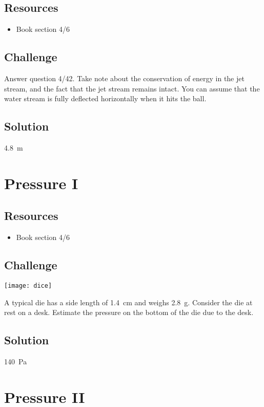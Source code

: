 \subsection*{Resources}
\begin{itemize}
    \item Book section 4/6
\end{itemize}

\subsection*{Challenge}
Answer question 4/42. Take note about the conservation of energy in the jet stream, and the fact that the jet stream remains intact. You can assume that the water stream is fully deflected horizontally when it hits the ball.

\subsection*{Solution}
\SI{4.8}{\meter}




\newpage
\section{Pressure I}

\subsection*{Resources}
\begin{itemize}
    \item Book section 4/6
\end{itemize}

\subsection*{Challenge}
\texttt{[image: dice]}

A typical die has a side length of \SI{1.4}{\cm} and weighs \SI{2.8}{\gram}. Consider the die at rest on a desk. Estimate the pressure on the bottom of the die due to the desk.

\subsection*{Solution}
\SI{140}{\pascal}




\newpage
\section{Pressure II}

